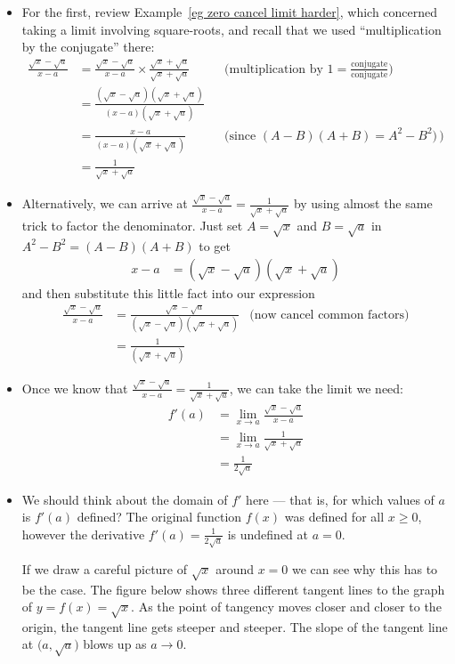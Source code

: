 \begin{eg}
\begin{itemize}
\item For the first, review Example~\ref{eg zero cancel limit
harder}, which concerned taking a limit involving square-roots, and recall that
we used  ``multiplication by the conjugate'' there:
\begin{align*}
  \frac{\sqrt{x}-\sqrt{a}}{x-a}
  &= \frac{\sqrt{x}-\sqrt{a}}{x-a} \times
              \frac{\sqrt{x}+\sqrt{a}}{\sqrt{x}+\sqrt{a}}
  && \Big(\text{multiplication by
        $1=\frac{\text{conjugate}}{\text{conjugate}}$}\Big)\\
  &=\frac{(\sqrt{x}-\sqrt{a})(\sqrt{x}+\sqrt{a})}
                        {(x-a)(\sqrt{x}+\sqrt{a})} \\
  &= \frac{x-a}{(x-a)(\sqrt{x}+\sqrt{a})}
  && \big(\text{since $(A-B)(A+B) = A^2-B^2$)}\,\big) \\
  &= \frac{1}{\sqrt{x}+\sqrt{a}}
\end{align*}
\item Alternatively, we can arrive at
$\frac{\sqrt{x}-\sqrt{a}}{x-a}=\frac{1}{\sqrt{x}+\sqrt{a}}$
by using almost the same trick to factor the denominator.
Just set $A=\sqrt{x}$ and  $B=\sqrt{a}$ in
$
  A^2 - B^2 = (A-B)(A+B)
$
to get
\begin{align*}
  x - a &= (\sqrt{x}-\sqrt{a})(\sqrt{x}+\sqrt{a})
\end{align*}
and then substitute this little fact into our expression
\begin{align*}
  \frac{\sqrt{x}-\sqrt{a}}{x-a}
  &=\frac{\sqrt{x}-\sqrt{a}}{(\sqrt{x}-\sqrt{a})(\sqrt{x}+\sqrt{a})}
  & \text{(now cancel common factors)}\\
  &=\frac{1}{(\sqrt{x}+\sqrt{a})}
\end{align*}
\item Once we know that $\frac{\sqrt{x}-\sqrt{a}}{x-a}=\frac{1}{\sqrt{x}+\sqrt{a}}$,  we
can take the limit we need:
\begin{align*}
f'(a)
&=\lim_{x\rightarrow a}\frac{\sqrt{x}-\sqrt{a}}{x-a}\\
&
=\lim_{x\rightarrow a}\frac{1}{\sqrt{x}+\sqrt{a}}\\
&
=\frac{1}{2\sqrt{a}}
\end{align*}
\item We should think about the domain of $f'$ here --- that is, for which
values of $a$ is $f'(a)$ defined? The original function $f(x)$ was
defined for all $x \geq 0$, however the derivative $f'(a)=\frac{1}{2\sqrt{a}}$
is undefined at $a = 0$.

If we draw a careful picture of $\sqrt{x}$ around $x=0$ we can see why this has
to be the case. The figure below shows three different tangent lines to
the graph of $y=f(x)=\sqrt{x}$. As the point of tangency moves closer and closer to the
origin, the tangent line gets steeper and steeper.
The slope of the tangent line at $\big(a,\sqrt{a}\big)$ blows up as
$a\to 0$.


\end{itemize}
\end{eg}
